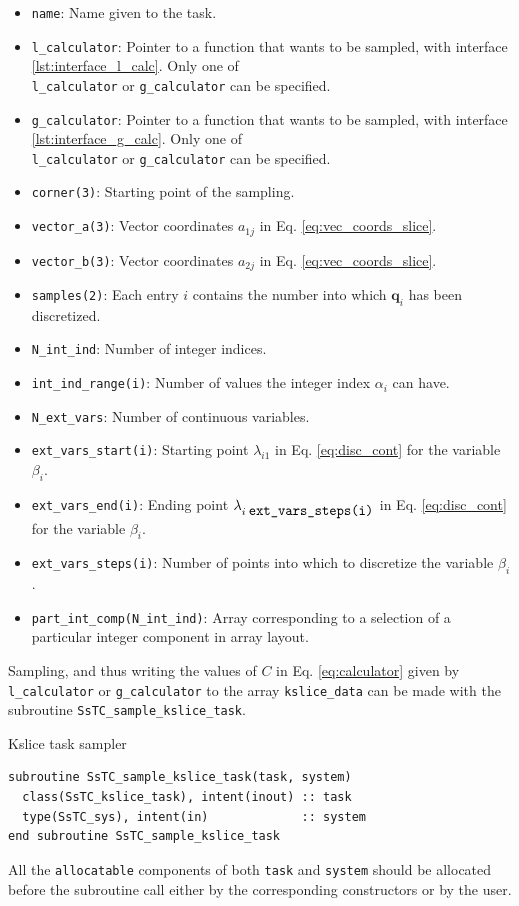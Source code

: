 \documentclass[10pt,a4paper]{article}
\begin{document}
\begin{tcolorbox}
\begin{itemize}
\item \verb|name|: Name given to the task.
\item \verb|l_calculator|: Pointer to a function that wants to be sampled, with interface \ref{lst:interface_l_calc}. Only one of \\ \verb|l_calculator| or \verb|g_calculator| can be specified.
\item \verb|g_calculator|: Pointer to a function that wants to be sampled, with interface \ref{lst:interface_g_calc}. Only one of \\ \verb|l_calculator| or \verb|g_calculator| can be specified.
\item \verb|corner(3)|: Starting point of the sampling.
\item \verb|vector_a(3)|: Vector coordinates $a_{1j}$ in Eq. \eqref{eq:vec_coords_slice}.
\item \verb|vector_b(3)|: Vector coordinates $a_{2j}$ in Eq. \eqref{eq:vec_coords_slice}.
\item \verb|samples(2)|: Each entry $i$ contains the number into which $\bm{q}_i$ has been discretized.
\item \verb|N_int_ind|: Number of integer indices.
\item \verb|int_ind_range(i)|: Number of values the integer index $\alpha_i$ can have.
\item \verb|N_ext_vars|: Number of continuous variables.
\item \verb|ext_vars_start(i)|: Starting point $\lambda_{i1}$ in Eq. \eqref{eq:disc_cont} for the variable $\beta_i$.
\item \verb|ext_vars_end(i)|: Ending point $\lambda_{i\;\verb|ext_vars_steps(i)|}$ in Eq. \eqref{eq:disc_cont} for the variable $\beta_i$.
\item \verb|ext_vars_steps(i)|: Number of points into which to discretize the variable $\beta_i$.
\item \verb|part_int_comp(N_int_ind)|: Array corresponding to a selection of a particular integer component in array layout.
\end{itemize}
\end{tcolorbox}
Sampling, and thus writing the values of $C$ in Eq. \eqref{eq:calculator} given by \verb|l_calculator| or \verb|g_calculator| to the array \verb|kslice_data| can be made with the subroutine \verb|SsTC_sample_kslice_task|.
\begin{codebox}{Kslice task sampler}
\begin{lstlisting}[caption={Interface of the kslice task sampler.},captionpos=b]
subroutine SsTC_sample_kslice_task(task, system)
  class(SsTC_kslice_task), intent(inout) :: task
  type(SsTC_sys), intent(in)             :: system
end subroutine SsTC_sample_kslice_task
\end{lstlisting}
\end{codebox}
All the \verb|allocatable| components of both \verb|task| and \verb|system| should be allocated before the subroutine call either by the corresponding constructors or by the user.
\end{document}
